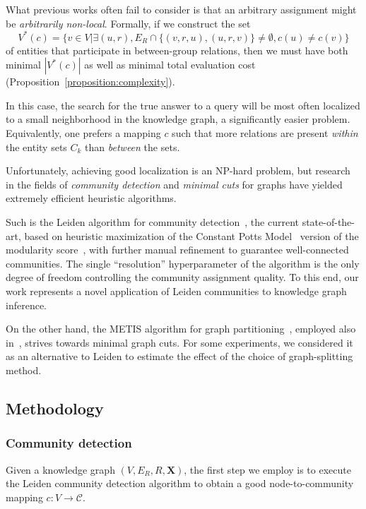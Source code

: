 What previous works often fail to consider is that an arbitrary assignment might be \emph{arbitrarily non-local}. Formally, if we construct the set $$V^*(c)=\{v \in V|\exists (u,r), E_R \cap \{(v,r,u), (u, r, v)\} \neq \emptyset, c(u) \neq c(v)\}$$ of entities that participate in between-group relations, then we must have both minimal $|V^*(c)|$ as well as minimal total evaluation cost (Proposition~\ref{proposition:complexity}). 

In this case, the search for the true answer to a query will be most often localized to a small neighborhood in the knowledge graph, a significantly easier problem. Equivalently, one prefers a mapping $c$ such that more relations are present \emph{within} the entity sets $C_k$ than \emph{between} the sets. 

Unfortunately, achieving good localization is an NP-hard problem, but research in the fields of \emph{community detection} and \emph{minimal cuts} for graphs have yielded extremely efficient heuristic algorithms. 

Such is the Leiden algorithm for community detection~\cite{traag_louvain_2019}, the current state-of-the-art, based on heuristic maximization of the Constant Potts Model~\cite{traag_narrow_2011} version of the modularity score~\cite{blondel_fast_2008}, with further manual refinement to guarantee well-connected communities. The single \enquote{resolution} hyperparameter of the algorithm is the only degree of freedom controlling the community assignment quality. To this end, our work represents a novel application of Leiden communities to knowledge graph inference. 

On the other hand, the METIS algorithm for graph partitioning~\cite{karypis_fast_1998}, employed also in~\cite{zheng_dgl-ke_2020}, strives towards minimal graph cuts. For some experiments, we considered it as an alternative to Leiden to estimate the effect of the choice of graph-splitting method.

\subsection{Methodology}
\label{sec:methodology}

\subsubsection{Community detection}

Given a knowledge graph $(V, E_R, R, \mathbf{X})$, the first step we employ is to execute the Leiden community detection algorithm to obtain a good node-to-community mapping $c: V \to \mathcal{C}$. 

